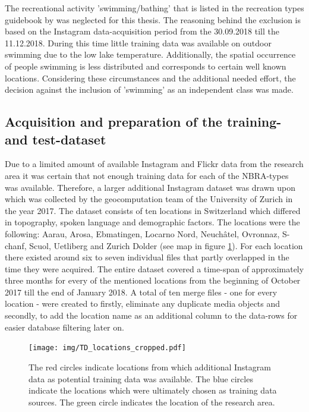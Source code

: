 The recreational activity 'swimming/bathing' that is listed in the recreation types guidebook by \textcite{IFL2018} was neglected for this thesis. The reasoning behind the exclusion is based on the Instagram data-acquisition period from the 30.09.2018 till the 11.12.2018. During this time little training data was available on outdoor swimming due to the low lake temperature. Additionally, the spatial occurrence of people swimming is less distributed and corresponds to certain well known locations. Considering these circumstances and the additional needed effort, the decision against the inclusion of 'swimming' as an independent class was made.

\subsection{Acquisition and preparation of the training- and test-dataset} \label{preparation_training_data}
Due to a limited amount of available Instagram and Flickr data from the research area it was certain that not enough training data for each of the NBRA-types was available. Therefore, a larger additional Instagram dataset was drawn upon which was collected by the geocomputation team of the University of Zurich \parencite{Gruzd2016} in the year 2017. The dataset consists of ten locations in Switzerland which differed in topography, spoken language and demographic factors. The locations were the following: Aarau, Arosa, Ebmatingen, Locarno Nord, Neuch\^{a}tel, Ovronnaz, S-chanf, Scuol, Uetliberg and Zurich Dolder (see map in figure \ref{fig:TD_locations}). For each location there existed around six to seven individual files that partly overlapped in the time they were acquired. The entire dataset covered a time-span of approximately three months for every of the mentioned locations from the beginning of October 2017 till the end of January 2018. A total of ten merge files - one for every location - were created to firstly, eliminate any duplicate media objects and secondly, to add the location name as an additional column to the data-rows for easier database filtering later on.\\

\begin{figure}[h]
   \centering
   \texttt{[image: img/TD\_locations\_cropped.pdf]}
   \caption{The red circles indicate locations from which additional Instagram data as potential training data was available. The blue circles indicate the locations which were ultimately chosen as training data sources. The green circle indicates the location of the research area.}
   \label{fig:TD_locations}
\end{figure}


